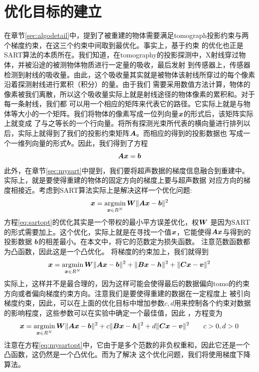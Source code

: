 \section{优化目标的建立}\label{sec:optobj}
在章节\ref{sec:algodetail}中，提到了被重建的物体需要满足tomograph投影约束与两个梯度约束，在这三个约束中间取到最优化。事实上，基于约束
的优化也正是SART算法的本质所在。我们知道，在tomography的投影探测中，X射线穿过物体，并被沿途的被测物体物质进行一定量的吸收，最后发射
到传感器上，传感器检测到射线的吸收量。由此，这个吸收量其实就是被物体该射线所穿过的每个像素沿着探测射线进行累积（积分）的量。由于我们
需要采用数值方法计算，物体的像素被我们离散，所以这个吸收量实际上就是射线途径的物体像素的累积和。对于每一条射线，我们都
可以用一个相应的矩阵来代表它的路径。它实际上就是与物体等大小的一个矩阵。我们将物体的像素写成一位列向量$\bm{ x}$的形式后，该矩阵实际上就变成
了与之等长的一个行向量。将所有探测光束所代表的横向量进行排列以后，实际上就得到了我们的投影约束矩阵$\bm{A}$。而相应的得到的投影数据也
写成一个一维列向量的形式$\bm{b}$。因此，我们得到了方程
\begin{equation}
\bm{A}\bm{ x} = \bm{b} \label{eq:tomocon}
\end{equation}
此外，在章节\ref{sec:mysart}中提到，我们要将超声数据的梯度信息融合到重建中。实际上，就是要使得重建的物体的固定方向的梯度上要与超声数据
对应方向的梯度相接近。考虑到SART算法实际上是解决这样一个优化问题:
\begin{equation}
\bm{ x} = \operatorname*{\arg\!\min}_{\bm{ x}\in R^N}\bm{W}\lVert\bm{A}\bm{ x}-\bm{b}\rVert^2 \label{eq:sartopt}
\end{equation}
方程\eqref{eq:sartopt}的优化其实是一个带权的最小平方误差优化，权$\bm{W}$ 是因为SART的形式需要加上。这个优化，实际上就是在寻找一个值$\bm{ x}$，它能使得$\bm{A}\bm{ x}$与得到的投影数据 $\bm{b}$的相差最小。在本文中，将它的范数定为损失函数。
注意范数函数都为凸函数，因此这是一个凸优化。
将梯度的约束加上，我们就得到
\begin{equation}
\bm{ x} = \operatorname*{\arg\!\min}_{\bm{ x}\in R^N}\bm{W}\lVert\bm{A}\bm{ x}-\bm{b}\rVert^2 +\lVert\bm{B}\bm{ x}-\bm{h}\rVert^2+\lVert\bm{C}\bm{ x}-\bm{v}\rVert^2 \notag
\end{equation}
实际上，这样并不是最合理的，因为这样可能会使得最后的数据偏向tomo的约束方向或者偏向梯度约束方向。注意我们是要使得重建的数据在一定程度上
被引向梯度约束，因此，可以在上面的优化目标中增加参数$c,d$用来控制各个约束对数据的影响程度，这些参数可以在实验中确定一个最佳值，因此
，方程变为
\begin{equation}
\bm{ x} = \operatorname*{\arg\!\min}_{\bm{ x}\in R^N}\bm{W}\lVert\bm{A}\bm{ x}-\bm{b}\rVert^2 +c\lVert\bm{B}\bm{ x}-\bm{h}\rVert^2+d\lVert\bm{C}\bm{ x}-\bm{v}\rVert^2 \qquad c>0,d>0 \label{eq:mysartopt}
\end{equation}
注意在方程\eqref{eq:mysartopt}中，它由于是多个范数的非负权重和，因此它还是一个凸函数\cite{boyd2004convex}，这仍然是一个凸优化。而为了解决
这个优化问题，我们将使用梯度下降算法\cite{nesterov2003}。



